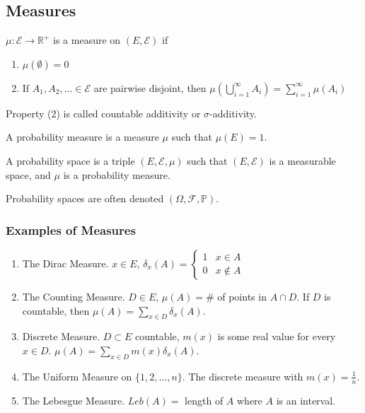 \documentclass[english, course]{Notes}
\begin{document}
\subsection{Measures}

\begin{definition}[Measure]
	$\mu: \mathcal{E} \to \mathbb{R^+}$ is a measure on $(E, \mathcal{E})$ if
	\begin{enumerate}
		\item $\mu(\emptyset) = 0$
		\item If $A_1, A_2, \dots \in \mathcal{E}$ are pairwise disjoint, then $\mu(\bigcup^\infty_{i = 1} A_i) = \sum^\infty_{i = 1}\mu(A_i)$
	\end{enumerate}
\end{definition}
Property (2) is called countable additivity or $\sigma$-additivity.\\

\begin{definition}
	A probability measure is a measure $\mu$ such that $\mu(E) = 1$.
\end{definition}

\begin{definition}
	A probability space is a triple $(E, \mathcal{E}, \mu)$ such that $(E, \mathcal{E})$ is a measurable space, and $\mu$ is a probability measure.
\end{definition}

Probability spaces are often denoted $(\Omega, \mathcal{F}, \mathbb{P})$.\\

\subsubsection{Examples of Measures}
\begin{enumerate}
	\item The Dirac Measure. $x \in E$, $\delta_x(A) =
	\begin{cases}
	1 & x \in A\\
	0 & x \not \in A
	\end{cases}$
	\item The Counting Measure. $D \in E$, $\mu(A) = $\# of points in $A \cap D$. If $D$ is countable, then $\mu(A) = \sum_{x \in D} \delta_x(A)$.
	\item Discrete Measure. $D \subset E$ countable, $m(x)$ is some real value for every $x \in D$. $\mu(A) = \sum_{x \in D} m(x)\delta_x(A)$.
	\item The Uniform Measure on $\{1, 2, \dots, n\}$. The discrete measure with $m(x) = \frac{1}{n}$.
	\item The Lebesgue Measure. $Leb(A) =$ length of $A$ where $A$ is an interval.
\end{enumerate}
\end{document}
